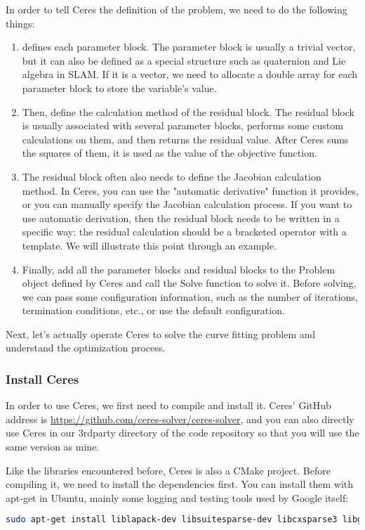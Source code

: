 In order to tell Ceres the definition of the problem, we need to do the following things:
\begin{enumerate}
    \item defines each parameter block. The parameter block is usually a trivial vector, but it can also be defined as a special structure such as quaternion and Lie algebra in SLAM. If it is a vector, we need to allocate a double array for each parameter block to store the variable's value.
    \item Then, define the calculation method of the residual block. The residual block is usually associated with several parameter blocks, performs some custom calculations on them, and then returns the residual value. After Ceres sums the squares of them, it is used as the value of the objective function.
    \item The residual block often also needs to define the Jacobian calculation method. In Ceres, you can use the "automatic derivative" function it provides, or you can manually specify the Jacobian calculation process. If you want to use automatic derivation, then the residual block needs to be written in a specific way: the residual calculation should be a bracketed operator with a template. We will illustrate this point through an example.
    \item Finally, add all the parameter blocks and residual blocks to the Problem object defined by Ceres and call the Solve function to solve it. Before solving, we can pass some configuration information, such as the number of iterations, termination conditions, etc., or use the default configuration.
\end{enumerate}
Next, let's actually operate Ceres to solve the curve fitting problem and understand the optimization process.

\subsubsection{Install Ceres}
In order to use Ceres, we first need to compile and install it. Ceres' GitHub address is \url{https://github.com/ceres-solver/ceres-solver}, and you can also directly use Ceres in our 3rdparty directory of the code repository so that you will use the same version as mine.

Like the libraries encountered before, Ceres is also a CMake project. Before compiling it, we need to install the dependencies first. You can install them with apt-get in Ubuntu, mainly some logging and testing tools used by Google itself:
\begin{lstlisting}[language=sh,caption=terminal input: ]
sudo apt-get install liblapack-dev libsuitesparse-dev libcxsparse3 libgflags-dev libgoogle-glog-dev libgtest-dev 
\end{lstlisting}

